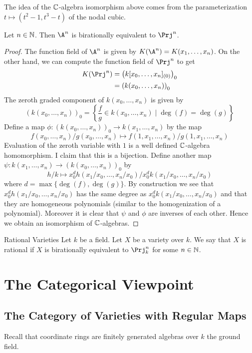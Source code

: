 \documentclass[a4paper]{article}
\begin{document}
The idea of the $\mathbb{C}$-algebra isomorphism above comes from the parameterization $t\mapsto(t^2-1,t^3-t)$ of the nodal cubic. 

\begin{lmm}{}{} Let $n\in\mathbb{N}$. Then $\A^n$ is birationally equivalent to $\Prj^n$. 
\begin{proof}
The function field of $\A^n$ is given by $K(\A^n)=K(x_1,\dots,x_n)$. On the other hand, we can compute the function field of $\Prj^n$ to get 
\begin{align*}
K(\Prj^n)&=\left(k[x_0,\dots,x_n]_{(0)}\right)_0\\
&=\left(k(x_0,\dots,x_n)\right)_0
\end{align*}
The zeroth graded component of $k(x_0,\dots,x_n)$ is given by $$(k(x_0,\dots,x_n))_0=\left\{\frac{f}{g}\in k(x_0,\dots,x_n)\;|\;\deg(f)=\deg(g)\right\}$$ Define a map $\phi:(k(x_0,\dots,x_n))_0\to k(x_1,\dots,x_n)$ by the map $$f(x_0,\dots,x_n)/g(x_0,\dots,x_n)\mapsto f(1,x_1,\dots,x_n)/g(1,x_1,\dots,x_n)$$ Evaluation of the zeroth variable with $1$ is a well defined $\mathbb{C}$-algebra homomorphism. I claim that this is a bijection. Define another map $\psi:k(x_1,\dots,x_n)\to(k(x_0,\dots,x_n))_0$ by $$h/k\mapsto x_0^d h(x_1/x_0,\dots,x_n/x_0)/x_0^d k(x_1/x_0,\dots,x_n/x_0)$$ where $d=\max\{\deg(f),\deg(g)\}$. By construction we see that $x_0^d h(x_1/x_0,\dots,x_n/x_0)$ has the same degree as $x_0^d k(x_1/x_0,\dots,x_n/x_0)$ and that they are homogeneous polynomials (similar to the homogenization of a polynomial). Moreover it is clear that $\psi$ and $\phi$ are inverses of each other. Hence we obtain an isomorphism of $\mathbb{C}$-algebras. 
\end{proof}
\end{lmm}

\begin{defn}{Rational Varieties}{} Let $k$ be a field. Let $X$ be a variety over $k$. We say that $X$ is rational if $X$ is birationally equivalent to $\Prj_k^n$ for some $n\in\mathbb{N}$. 
\end{defn}

\pagebreak
\section{The Categorical Viewpoint}
\subsection{The Category of Varieties with Regular Maps}
Recall that coordinate rings are finitely generated algebras over $k$ the ground field. 
\end{document}
